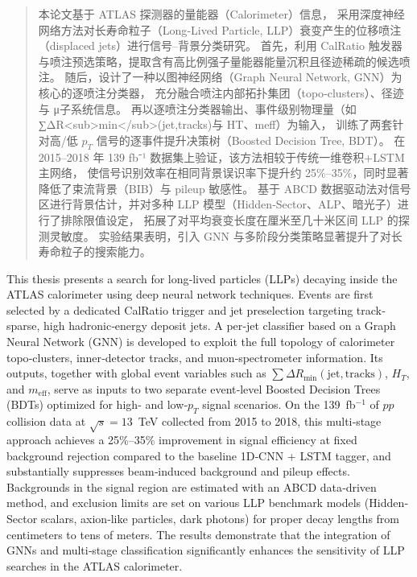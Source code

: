 

\begin{abstract}
  本论文基于 ATLAS 探测器的量能器（Calorimeter）信息，
  采用深度神经网络方法对长寿命粒子（Long‐Lived Particle, LLP）衰变产生的位移喷注（displaced jets）进行信号–背景分类研究。
  首先，利用 CalRatio 触发器与喷注预选策略，提取含有高比例强子量能器能量沉积且径迹稀疏的候选喷注。
  随后，设计了一种以图神经网络（Graph Neural Network, GNN）为核心的逐喷注分类器，
  充分融合喷注内部拓扑集团（topo‐clusters）、径迹与 μ子系统信息。
  再以逐喷注分类器输出、事件级别物理量（如∑ΔR<sub>min</sub>(jet,tracks)与 HT、meff）为输入，
  训练了两套针对高/低 $p_{T}$ 信号的逐事件提升决策树（Boosted Decision Tree, BDT）。
  在 2015–2018 年 139 fb⁻¹ 数据集上验证，该方法相较于传统一维卷积+LSTM 主网络，
  使信号识别效率在相同背景误识率下提升约 25\%–35\%，同时显著降低了束流背景（BIB）与 pileup 敏感性。
  基于 ABCD 数据驱动法对信号区进行背景估计，并对多种 LLP 模型（Hidden‐Sector、ALP、暗光子）进行了排除限值设定，
  拓展了对平均衰变长度在厘米至几十米区间 LLP 的探测灵敏度。
  实验结果表明，引入 GNN 与多阶段分类策略显著提升了对长寿命粒子的搜索能力。

\end{abstract}

\begin{abstract*}
  This thesis presents a search for long‐lived particles (LLPs) decaying inside the ATLAS calorimeter using deep neural network techniques. Events are first selected by a dedicated CalRatio trigger and jet preselection targeting track‐sparse, high hadronic‐energy deposit jets. A per‐jet classifier based on a Graph Neural Network (GNN) is developed to exploit the full topology of calorimeter topo‐clusters, inner‐detector tracks, and muon‐spectrometer information. Its outputs, together with global event variables such as $\sum\Delta R_{\min}(\text{jet},\text{tracks})$, $H_{T}$, and $m_{\text{eff}}$, serve as inputs to two separate event‐level Boosted Decision Trees (BDTs) optimized for high‐ and low‐$p_{T}$ signal scenarios. On the 139 fb$^{-1}$ of $pp$ collision data at $\sqrt{s}=13$ TeV collected from 2015 to 2018, this multi‐stage approach achieves a 25\%–35\% improvement in signal efficiency at fixed background rejection compared to the baseline 1D‐CNN + LSTM tagger, and substantially suppresses beam‐induced background and pileup effects. Backgrounds in the signal region are estimated with an ABCD data‐driven method, and exclusion limits are set on various LLP benchmark models (Hidden‐Sector scalars, axion‐like particles, dark photons) for proper decay lengths from centimeters to tens of meters. The results demonstrate that the integration of GNNs and multi‐stage classification significantly enhances the sensitivity of LLP searches in the ATLAS calorimeter.

\end{abstract*}

